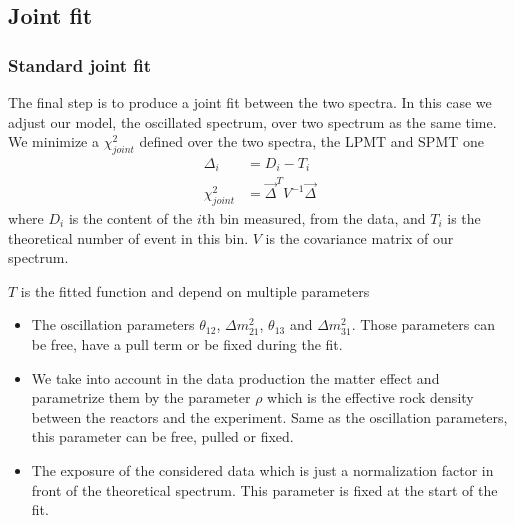 \documentclass[../main.tex]{subfiles}
\begin{document}
%
%
%
%
%
%
%
%
%

\subsection{Joint fit}

\subsubsection{Standard joint fit}

The final step is to produce a joint fit between the two spectra. In this case we adjust our model, the oscillated spectrum, over two spectrum as the same time. We minimize a $\chi^2_{joint}$ defined over the two spectra, the LPMT and SPMT one
\begin{align}
  \Delta_i &= D_{i} - T_{i} \\
  \chi^2_{joint} &= \vec{\Delta}^T V^{-1} \vec{\Delta}
\end{align}
where $D_{i}$ is the content of the $i$th bin measured, from the data, and $T_{i}$ is the theoretical number of event in this bin. $V$ is the covariance matrix of our spectrum.

$T$ is the fitted function and depend on multiple parameters
\begin{itemize}
  \item The oscillation parameters $\theta_{12}$, $\Delta m^2_{21}$, $\theta_{13}$ and $\Delta m^2_{31}$. Those parameters can be free, have a pull term or be fixed during the fit.
  \item We take into account in the data production the matter effect and parametrize them by the parameter $\rho$ which is the effective rock density between the reactors and the experiment. Same as the oscillation parameters, this parameter can be free, pulled or fixed.
  \item The exposure of the considered data which is just a normalization factor in front of the theoretical spectrum. This parameter is fixed at the start of the fit.
\end{itemize}
\end{document}
